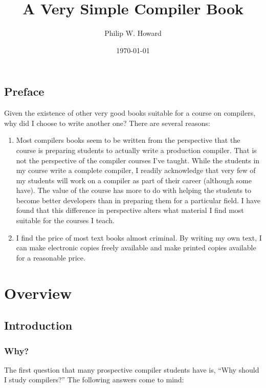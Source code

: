 \documentclass[letterpaper,12pt,openany,reqno]{book}%
\begin{document}
\frontmatter
\title{A Very Simple Compiler Book}
\author{Philip W. Howard}
\date{\today}
\maketitle
\tableofcontents
\listoffigures
\chapter{Preface}

Given the existence of other very good books suitable for a course on compilers, why did I choose to write another one? There are several reasons:
  
\begin{enumerate}
\item Most compilers books seem to be written from the perspective that the course is preparing students to actually write a production compiler. That is not the perspective of the compiler courses I've taught. While the students in my course write a complete compiler, I readily acknowledge that very few of my students will work on a compiler as part of their career (although some have). The value of the course has more to do with helping the students to become better developers than in preparing them for a particular field. I have found that this difference in perspective alters what material I find most suitable for the courses I teach. 
\item I find the price of most text books almost criminal. By writing my own text, I can make electronic copies freely available and make printed copies available for a reasonable price.
\end{enumerate}

\mainmatter
\setlength{\parindent}{0cm} %
\setlength{\parskip}{12pt plus 2pt minus 2pt}

\part{Overview}
\chapter{Introduction}
\section{Why?}
The first question that many prospective compiler students have is, ``Why should I study compilers?'' The following answers come to mind:
\end{document}
